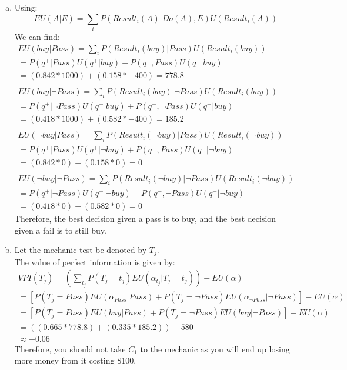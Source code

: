 \documentclass{article}
\begin{document}
\begin{enumerate}[a)]
    \clearpage
    \item Using:
        \[ EU(A|E) = \sum_{i}P(Result_i(A) | Do(A), E) U(Result_i(A)) \]
    We can find:
        \begin{gather*}
            EU(buy | Pass) = \sum_{i}P(Result_i(buy) | Pass) U(Result_i(buy))\\
                = P(q^+ | Pass) U(q^+ | buy) + P(q^-,Pass)U(q^- | buy)\\
                = (0.842 * 1000) + (0.158 * -400) = 778.8\\
            \\
            EU(buy | \neg Pass) = \sum_{i}P(Result_i(buy) | \neg Pass) U(Result_i(buy)) \\
                = P(q^+ | \neg Pass) U(q^+ | buy) + P(q^-, \neg Pass)U(q^- | buy)\\
                = (0.418 * 1000) + (0.582 * -400) = 185.2\\
            \\
            EU(\neg buy | Pass) = \sum_{i}P(Result_i(\neg buy) | Pass) U(Result_i(\neg buy)) \\
                = P(q^+ | Pass) U(q^+ | \neg buy) + P(q^-,Pass)U(q^- | \neg buy)\\
                = (0.842 * 0) + (0.158 * 0) = 0\\
            \\
            EU(\neg buy | \neg Pass) = \sum_{i}P(Result_i(\neg buy) | \neg Pass) U(Result_i(\neg buy)) \\
                = P(q^+ | \neg Pass) U(q^+ | \neg buy) + P(q^-, \neg Pass)U(q^- | \neg buy)\\
                = (0.418 * 0) + (0.582 * 0) = 0
        \end{gather*}
        Therefore, the best decision given a pass is to buy, and the best decision 
            given a fail is to still buy.
    
    \clearpage
    \item Let the mechanic test be denoted by $T_j$.\\
    The value of perfect information is given by:
        \begin{gather*}
            VPI(T_j) = (\sum_{t_j}P(T_j=t_j)EU(\alpha_{t_j}|T_j=t_j)) - EU(\alpha)\\
                = [P(T_j = Pass) EU(\alpha_{Pass} | Pass) + P(T_j = \neg Pass) EU(\alpha_{\neg Pass} | \neg Pass)] - EU(\alpha)\\
                = [P(T_j = Pass) EU(buy | Pass) + P(T_j = \neg Pass) EU(buy | \neg Pass)] - EU(\alpha)\\
                = ((0.665 * 778.8) + (0.335 * 185.2)) - 580\\ 
                \approx -0.06
        \end{gather*}
    Therefore, you should not take $C_1$ to the mechanic as you will end up losing more money from it
    costing \$100.
\end{enumerate}
\end{document}
